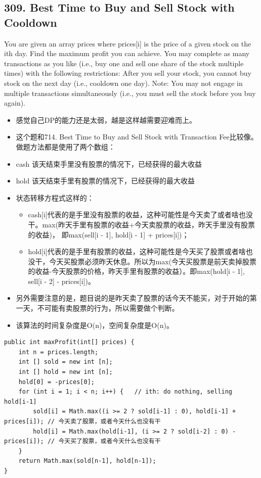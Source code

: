 \documentclass[9pt, b5paper]{article}
\begin{document}
\subsection{309. Best Time to Buy and Sell Stock with Cooldown}
\label{sec-4-30}
You are given an array prices where prices[i] is the price of a given stock on the ith day.
Find the maximum profit you can achieve. You may complete as many transactions as you like (i.e., buy one and sell one share of the stock multiple times) with the following restrictions:
After you sell your stock, you cannot buy stock on the next day (i.e., cooldown one day).
Note: You may not engage in multiple transactions simultaneously (i.e., you must sell the stock before you buy again).
\begin{itemize}
\item 感觉自己DP的能力还是太弱，越是这样越需要迎难而上。
\item 这个题和714. Best Time to Buy and Sell Stock with Transaction Fee比较像。做题方法都是使用了两个数组：
\item cash 该天结束手里没有股票的情况下，已经获得的最大收益
\item hold 该天结束手里有股票的情况下，已经获得的最大收益
\item 状态转移方程式这样的：
\begin{itemize}
\item cash[i]代表的是手里没有股票的收益，这种可能性是今天卖了或者啥也没干。max(昨天手里有股票的收益+今天卖股票的收益，昨天手里没有股票的收益)， 即max(sell[i - 1], hold[i - 1] + prices[i])；
\item hold[i]代表的是手里有股票的收益，这种可能性是今天买了股票或者啥也没干，今天买股票必须昨天休息。所以为max(今天买股票是前天卖掉股票的收益-今天股票的价格，昨天手里有股票的收益）。即max(hold[i - 1], sell[i - 2] - prices[i])。
\end{itemize}
\item 另外需要注意的是，题目说的是昨天卖了股票的话今天不能买，对于开始的第一天，不可能有卖股票的行为，所以需要做个判断。
\item 该算法的时间复杂度是O(n)，空间复杂度是O(n)。
\end{itemize}
\begin{verbatim}
public int maxProfit(int[] prices) {
    int n = prices.length;
    int [] sold = new int [n];
    int [] hold = new int [n];
    hold[0] = -prices[0];
    for (int i = 1; i < n; i++) {   // ith: do nothing, selling hold[i-1]
        sold[i] = Math.max((i >= 2 ? sold[i-1] : 0), hold[i-1] + prices[i]); // 今天卖了股票，或者今天什么也没有干
        hold[i] = Math.max(hold[i-1], (i >= 2 ? sold[i-2] : 0) - prices[i]); // 今天买了股票，或者今天什么也没有干
    }
    return Math.max(sold[n-1], hold[n-1]);
}
\end{verbatim}
\end{document}

